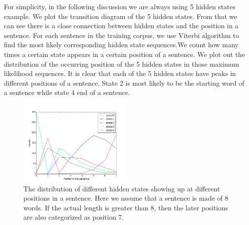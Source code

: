 For simplicity, in the following discussion we are always using 5 hidden states example.  We plot the transition diagram of the 5 hidden states. From that we can see there is a close connection between hidden states and the position in a sentence.
For each sentence in the training corpus, we use Viterbi algorithm to find the most likely corresponding hidden state sequences.We count how many times a certain state appears in a certain position of a sentence.  We plot out the distribution of the occurring position of the 5 hidden states in those maximum likelihood sequences. 
It is clear that each of the 5 hidden states have peaks in different positions of a sentence. State 2 is most likely to be the starting word of a sentence while state 4 end of a sentence.
 \begin{figure}
 \includegraphics[width=0.5\textwidth]{./figure/hiddenstates_position_in_the_sentence.png}
 \caption{The distribution of different hidden states showing up at different positions in a sentence. Here we assume that a sentence is made of 8 words. If the actual length is greater than 8, then the later positions are also categorized as position 7.\label{fig:position}}
\end{figure}
\section*{}
\vspace{10pt}
